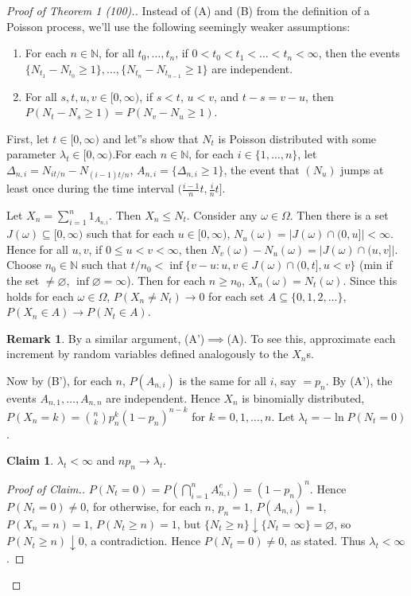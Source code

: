 \documentclass{article}
\newcommand{\N}{\mathbb{N}}
\theoremstyle{definition}
\newtheorem*{remark}{Remark}
\newtheorem*{claim}{Claim}
\begin{document}
\begin{proof}[Proof of Theorem 1 (100).]
Instead of (A) and (B) from the definition of a Poisson process, we'll use the following seemingly weaker assumptions:
\begin{enumerate}[(A')]
    \item For each $n \in \N$, for all $t_0, \dots, t_n$, if $0 < t_0 < t_1 < \dots < t_n < \infty$, then the events $\{N_{t_1} - N_{t_0} \geq 1\}, \dots, \{N_{t_n} - N_{t_{n-1}} \geq 1\}$ are independent.
    \item For all $s, t, u, v \in [0,\infty)$, if $s < t$, $u < v$, and $t - s = v - u$, then $P(N_t - N_s \geq 1) = P(N_v - N_u \geq 1)$.
\end{enumerate}
First, let $t \in [0, \infty)$ and let''s show that $N_t$ is Poisson distributed with some parameter $\lambda_t \in [0, \infty)$.For each $n \in \N$, for each $i \in \{1, \dots, n\}$, let $\Delta_{n,i} = N_{it/n} - N_{(i-1)t/n}$, $A_{n,i} = \{\Delta_{n,i} \geq 1\}$, the event that $(N_u)$ jumps at least once during the time interval $(\frac{i-1}{n}t, \frac{i}{n}t]$.

Let $X_n = \sum_{i=1}^n 1_{A_{n,i}}$. Then $X_n \leq N_t$. Consider any $\omega \in \Omega$. Then there is a set $J(\omega) \subseteq [0, \infty)$ such that for each $u \in [0, \infty)$, $N_u(\omega) = |J(\omega) \cap (0, u]| < \infty$. Hence for all $u, v$, if $0 \leq u < v < \infty$, then $N_v(\omega) - N_u(\omega) = |J(\omega) \cap (u, v]|$. Choose $n_0 \in \N$ such that $t/n_0 < \inf\{v-u: u, v \in J(\omega) \cap (0, t], u < v\}$ (min if the set $\neq \varnothing$, $\inf \varnothing = \infty$). Then for each $n \geq n_0$, $X_n(\omega) = N_t(\omega)$. Since this holds for each $\omega \in \Omega$, $P(X_n \neq N_t) \to 0$ for each set $A \subseteq \{0, 1, 2, \dots\}$, $P(X_n \in A) \to P(N_t \in A)$.

\begin{remark}
By a similar argument, (A')$\implies$(A). To see this, approximate each increment by random variables defined analogously to the $X_n$s.
\end{remark}

Now by (B'), for each $n$, $P(A_{n,i})$ is the same for all $i$, say $= p_n$. By (A'), the events $A_{n,1}, \dots, A_{n,n}$ are independent. Hence $X_n$ is binomially distributed, $P(X_n = k) = \binom{n}{k}p_n^k(1-p_n)^{n-k}$ for $k = 0, 1, \dots, n$. Let $\lambda_t = -\ln P(N_t = 0)$.

\begin{claim}
    $\lambda_t < \infty$ and $np_n \to \lambda_t$.
\end{claim}
\begin{proof}[Proof of Claim.]
    $P(N_t = 0) = P\left( \bigcap_{i=1}^n A_{n,i}^c\right) = (1-p_n)^n$. Hence $P(N_t = 0) \neq 0$, for otherwise, for each $n$, $p_n = 1$, $P(A_{n,i}) = 1$, $P(X_n = n) = 1$, $P(N_t \geq n) = 1$, but $\{N_t \geq n\} \downarrow \{N_t = \infty\} = \varnothing$, so $P(N_t \geq n) \downarrow 0$, a contradiction. Hence $P(N_t = 0) \neq 0$, as stated. Thus $\lambda_t < \infty$.
    

\end{proof}
\end{proof}
\end{document}
